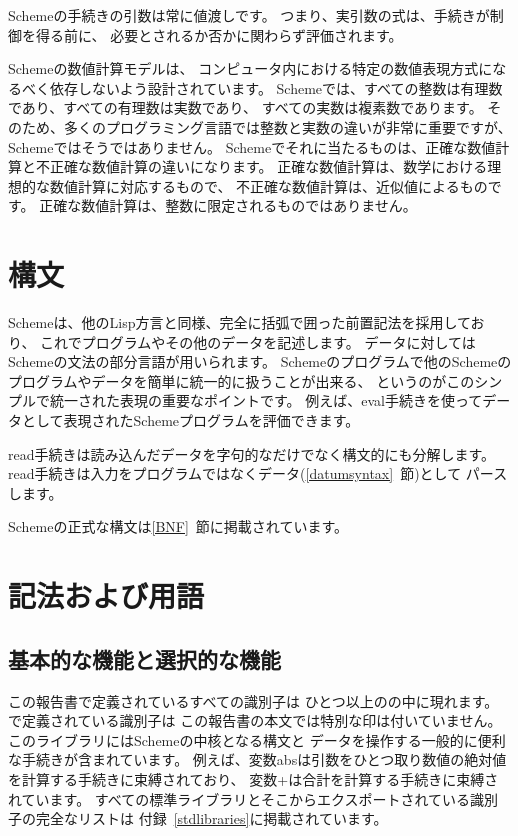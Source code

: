 \vest Schemeの手続きの引数は常に値渡しです。
つまり、実引数の式は、手続きが制御を得る前に、
必要とされるか否かに関わらず評価されます。

\vest Schemeの数値計算モデルは、
コンピュータ内における特定の数値表現方式になるべく依存しないよう設計されています。
Schemeでは、すべての整数は有理数であり、すべての有理数は実数であり、
すべての実数は複素数であります。
そのため、多くのプログラミング言語では整数と実数の違いが非常に重要ですが、
Schemeではそうではありません。
Schemeでそれに当たるものは、正確な数値計算と不正確な数値計算の違いになります。
正確な数値計算は、数学における理想的な数値計算に対応するもので、
不正確な数値計算は、近似値によるものです。
正確な数値計算は、整数に限定されるものではありません。

\section{構文}

Schemeは、他のLisp方言と同様、完全に括弧で囲った前置記法を採用しており、
これでプログラムやその他のデータを記述します。
データに対してはSchemeの文法の部分言語が用いられます。
Schemeのプログラムで他のSchemeのプログラムやデータを簡単に統一的に扱うことが出来る、
というのがこのシンプルで統一された表現の重要なポイントです。
例えば、{\cf eval}手続きを使ってデータとして表現されたSchemeプログラムを評価できます。

{\cf read}手続きは読み込んだデータを字句的なだけでなく構文的にも分解します。
{\cf read}手続きは入力をプログラムではなくデータ(\ref{datumsyntax}~節)として
パースします。

Schemeの正式な構文は\ref{BNF}~節に掲載されています。


\section{記法および用語}


\subsection{基本的な機能と選択的な機能}
\label{qualifiers}

この報告書で定義されているすべての識別子は
ひとつ以上のの中に現れます。
で定義されている識別子は
この報告書の本文では特別な印は付いていません。
このライブラリにはSchemeの中核となる構文と
データを操作する一般的に便利な手続きが含まれています。
例えば、変数{\cf abs}は引数をひとつ取り数値の絶対値を計算する手続きに束縛されており、
変数{\cf +}は合計を計算する手続きに束縛されています。
すべての標準ライブラリとそこからエクスポートされている識別子の完全なリストは
付録~\ref{stdlibraries}に掲載されています。

